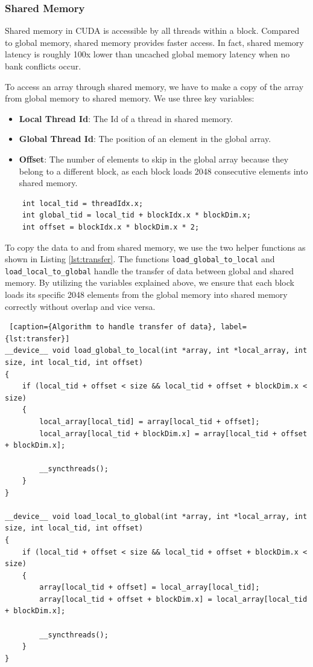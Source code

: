 \documentclass[a4paper,12pt]{article}
\begin{document}
\subsubsection*{Shared Memory}
Shared memory in CUDA is accessible by all threads within a block. Compared to global memory, shared memory provides faster access. In fact, shared memory latency is roughly 100x lower than uncached global memory latency when no bank conflicts occur. 

To access an array through shared memory, we have to make a copy of the array from global memory to shared memory. We use three key variables:
\begin{itemize}
    \item \textbf{Local Thread Id}: The Id of a thread in shared memory.
    \item \textbf{Global Thread Id}: The position of an element in the global array.
    \item \textbf{Offset}: The number of elements to skip in the global array because they belong to a different block, as each block loads 2048 consecutive elements into shared memory.
\end{itemize}

\begin{lstlisting}
    int local_tid = threadIdx.x;
    int global_tid = local_tid + blockIdx.x * blockDim.x;
    int offset = blockIdx.x * blockDim.x * 2;
\end{lstlisting}
To copy the data to and from shared memory, we use the two helper functions as shown in Listing \ref{lst:transfer}. The functions \texttt{load\_global\_to\_local} and \texttt{load\_local\_to\_global} handle the transfer of data between global and shared memory. By utilizing the variables explained above, we ensure that each block loads its specific 2048 elements from the global memory into shared memory correctly without overlap and vice versa.
\\
\begin{lstlisting} [caption={Algorithm to handle transfer of data}, label={lst:transfer}]
__device__ void load_global_to_local(int *array, int *local_array, int size, int local_tid, int offset)
{
    if (local_tid + offset < size && local_tid + offset + blockDim.x < size)
    {
        local_array[local_tid] = array[local_tid + offset];
        local_array[local_tid + blockDim.x] = array[local_tid + offset + blockDim.x];

        __syncthreads();
    }
}

__device__ void load_local_to_global(int *array, int *local_array, int size, int local_tid, int offset)
{
    if (local_tid + offset < size && local_tid + offset + blockDim.x < size)
    {
        array[local_tid + offset] = local_array[local_tid];
        array[local_tid + offset + blockDim.x] = local_array[local_tid + blockDim.x];

        __syncthreads();
    }
}
\end{lstlisting}
\end{document}

